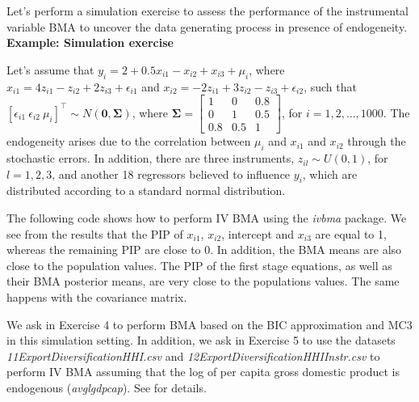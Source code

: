 \clearpage

Let's perform a simulation exercise to assess the performance of the instrumental variable BMA to uncover the data generating process in presence of endogeneity.\\

\textbf{Example: Simulation exercise}

Let's assume that $y_i = 2 + 0.5x_{i1} - x_{i2} + x_{i3} + \mu_i$, where $x_{i1} = 4z_{i1} - z_{i2} + 2z_{i3} + \epsilon_{i1}$ and $x_{i2} = -2z_{i1} + 3z_{i2} - z_{i3} + \epsilon_{i2}$, such that $[\epsilon_{i1} \ \epsilon_{i2} \ \mu_i]^{\top} \sim N(\bm{0}, \bm{\Sigma})$, where $\bm{\Sigma} = \begin{bmatrix} 1 & 0 & 0.8 \\ 0 & 1 & 0.5 \\ 0.8 & 0.5 & 1 \end{bmatrix}$, for $i = 1, 2, \dots, 1000$. The endogeneity arises due to the correlation between $\mu_i$ and $x_{i1}$ and $x_{i2}$ through the stochastic errors. In addition, there are three instruments, $z_{il} \sim U(0,1)$, for $l = 1, 2, 3$, and another 18 regressors believed to influence $y_i$, which are distributed according to a standard normal distribution.

The following code shows how to perform IV BMA using the \textit{ivbma} package. We see from the results that the PIP of $x_{i1}$, $x_{i2}$, intercept and $x_{i3}$ are equal to 1, whereas the remaining PIP are close to 0. In addition, the BMA means are also close to the population values. The PIP of the first stage equations, as well as their BMA posterior means, are very close to the populations values. The same happens with the covariance matrix. 

We ask in Exercise 4 to perform BMA based on the BIC approximation and MC3 in this simulation setting. In addition, we ask in Exercise 5 to use the datasets \textit{11ExportDiversificationHHI.csv} and \textit{12ExportDiversificationHHIInstr.csv} to perform IV BMA assuming that the log of per capita gross domestic product is endogenous (\textit{avglgdpcap}). See \cite{Jetter2015} for details.     


